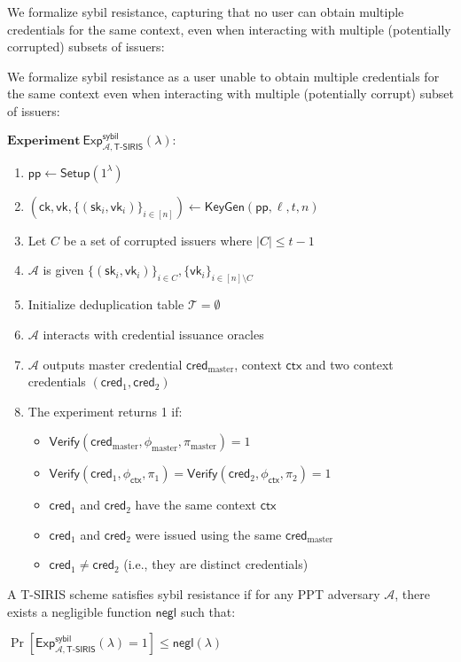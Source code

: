 We formalize sybil resistance, capturing that no user can obtain multiple credentials for the same context, even when interacting with multiple (potentially corrupted) subsets of issuers:

\begin{definition}
We formalize sybil resistance as a user unable to obtain multiple credentials for the same context even when interacting with multiple (potentially corrupt) subset of issuers:

$\textbf{Experiment}~\mathsf{Exp}^{\mathsf{sybil}}_{\mathcal{A},\mathsf{T\text{-}SIRIS}}(\lambda):$
\begin{enumerate}
    \item $\mathsf{pp} \leftarrow \mathsf{Setup}(1^\lambda)$
    \item $(\mathsf{ck}, \mathsf{vk}, \{(\mathsf{sk}_i, \mathsf{vk}_i)\}_{i\in[n]}) \leftarrow \mathsf{KeyGen}(\mathsf{pp}, \ell, t, n)$
    \item Let $C$ be a set of corrupted issuers where $|C| \leq t-1$
    \item $\mathcal{A}$ is given $\{(\mathsf{sk}_i, \mathsf{vk}_i)\}_{i\in C}, \{\mathsf{vk}_i\}_{i\in[n]\setminus C}$
    \item Initialize deduplication table $\mathcal{T} = \emptyset$
    \item $\mathcal{A}$ interacts with credential issuance oracles
    \item $\mathcal{A}$ outputs master credential $\mathsf{cred}_{\text{master}}$, context $\mathsf{ctx}$ and two context credentials $(\mathsf{cred}_1, \mathsf{cred}_2)$
    \item The experiment returns 1 if:
    \begin{itemize}
        \item $\mathsf{Verify}(\mathsf{cred}_{\text{master}}, \phi_{\text{master}}, \pi_{\text{master}}) = 1$
        \item $\mathsf{Verify}(\mathsf{cred}_1, \phi_{\mathsf{ctx}}, \pi_1) = \mathsf{Verify}(\mathsf{cred}_2, \phi_{\mathsf{ctx}}, \pi_2) = 1$
        \item $\mathsf{cred}_1$ and $\mathsf{cred}_2$ have the same context $\mathsf{ctx}$
        \item $\mathsf{cred}_1$ and $\mathsf{cred}_2$ were issued using the same $\mathsf{cred}_{\text{master}}$
        \item $\mathsf{cred}_1 \neq \mathsf{cred}_2$ (i.e., they are distinct credentials)
    \end{itemize}
\end{enumerate}

A T-SIRIS scheme satisfies sybil resistance if for any PPT adversary $\mathcal{A}$, there exists a negligible function $\mathsf{negl}$ such that:

$\Pr[\mathsf{Exp}^{\mathsf{sybil}}_{\mathcal{A},\mathsf{T\text{-}SIRIS}}(\lambda) = 1] \leq \mathsf{negl}(\lambda)$
\end{definition}



